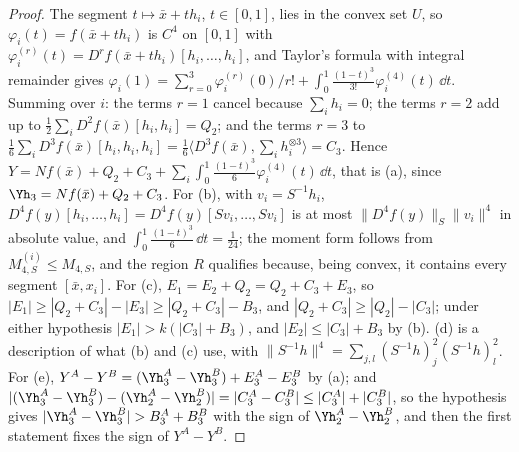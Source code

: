\begin{proof}
The segment $t\mapsto\bar x+th_i$, $t\in[0,1]$, lies in the convex set $U$, so $\varphi_i(t)=f(\bar x+th_i)$ is $C^4$ on $[0,1]$ with $\varphi_i^{(r)}(t)=D^r\!f(\bar x+th_i)[h_i,\dots,h_i]$, and Taylor's formula with integral remainder \citep[Ch.~VIII]{dieudonne1960} gives $\varphi_i(1)=\sum_{r=0}^3\varphi_i^{(r)}(0)/r!+\int_0^1\frac{(1-t)^3}{3!}\varphi_i^{(4)}(t)\,\dd t$. Summing over $i$: the terms $r=1$ cancel because $\sum_ih_i=0$; the terms $r=2$ add up to $\frac12\sum_iD^2\!f(\bar x)[h_i,h_i]=Q_2$; and the terms $r=3$ to $\frac16\sum_iD^3\!f(\bar x)[h_i,h_i,h_i]=\frac16\langle D^3\!f(\bar x),\sum_ih_i^{\otimes3}\rangle=C_3$. Hence $Y=Nf(\bar x)+Q_2+C_3+\sum_i\int_0^1\frac{(1-t)^3}{6}\varphi_i^{(4)}(t)\,\dd t$, that is (a), since $\Yh_3=Nf(\bar x)+Q_2+C_3$. For (b), with $v_i=S^{-1}h_i$, $D^4\!f(y)[h_i,\dots,h_i]=D^4\!f(y)[Sv_i,\dots,Sv_i]$ is at most $\|D^4\!f(y)\|_S\|v_i\|^4$ in absolute value, and $\int_0^1\frac{(1-t)^3}{6}\,\dd t=\frac1{24}$; the moment form follows from $M_{4,S}^{(i)}\le M_{4,S}$, and the region $R$ qualifies because, being convex, it contains every segment $[\bar x,x_i]$. For (c), $E_1=E_2+Q_2=Q_2+C_3+E_3$, so $|E_1|\ge|Q_2+C_3|-|E_3|\ge|Q_2+C_3|-B_3$, and $|Q_2+C_3|\ge|Q_2|-|C_3|$; under either hypothesis $|E_1|>k(|C_3|+B_3)$, and $|E_2|\le|C_3|+B_3$ by (b). (d) is a description of what (b) and (c) use, with $\|S^{-1}h\|^4=\sum_{j,l}(S^{-1}h)_j^2(S^{-1}h)_l^2$. For (e), $Y^A-Y^B=(\Yh_3^A-\Yh_3^B)+E_3^A-E_3^B$ by (a); and $|(\Yh_3^A-\Yh_3^B)-(\Yh_2^A-\Yh_2^B)|=|C_3^A-C_3^B|\le|C_3^A|+|C_3^B|$, so the hypothesis gives $|\Yh_3^A-\Yh_3^B|>B_3^A+B_3^B$ with the sign of $\Yh_2^A-\Yh_2^B$, and then the first statement fixes the sign of $Y^A-Y^B$.
\end{proof}

